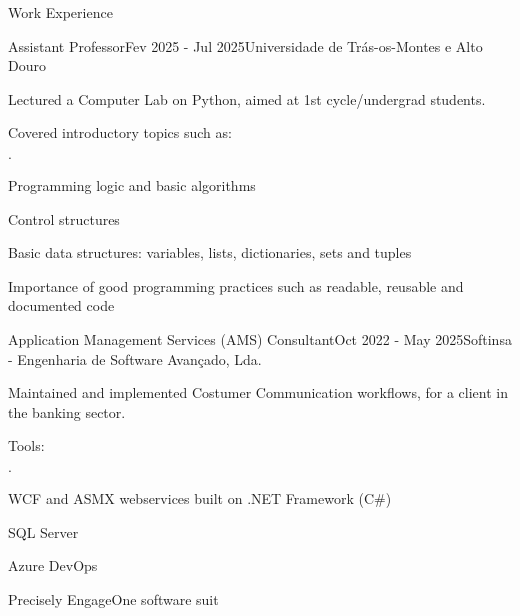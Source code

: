 \documentclass[a4paper]{resume} %
\begin{document}
\begin{rSection}{Work Experience}

\begin{rSubsection}{Assistant Professor}{Fev 2025 - Jul 2025}{Universidade de Trás-os-Montes e Alto Douro}{}

    \item Lectured a Computer Lab on Python, aimed at 1st cycle/undergrad students.
    
    \item Covered introductory topics such as:
        \begin{list}{$\cdot$}{}
		      \setlength{\itemsep}{-0.5em} \vspace{-0.5em}
            \item Programming logic and basic algorithms
            \item Control structures
            \item Basic data structures: variables, lists, dictionaries, sets and tuples
            \item Importance of good programming practices such as readable, reusable and documented code
	    \end{list}
        
\end{rSubsection}

\vspace{1em}

\begin{rSubsection}{Application Management Services (AMS) Consultant}{Oct 2022 - May 2025}{Softinsa - Engenharia de Software Avançado, Lda.}{}

    \item Maintained and implemented Costumer Communication workflows, for a client in the banking sector.
    
    \item Tools:
        \begin{list}{$\cdot$}{}
		      \setlength{\itemsep}{-0.5em} \vspace{-0.5em}
            \item WCF and ASMX webservices built on .NET Framework (C\#)
            \item SQL Server
            \item Azure DevOps
            \item Precisely EngageOne software suit
	    \end{list}
    

\end{rSubsection}
\end{rSection}
\end{document}
